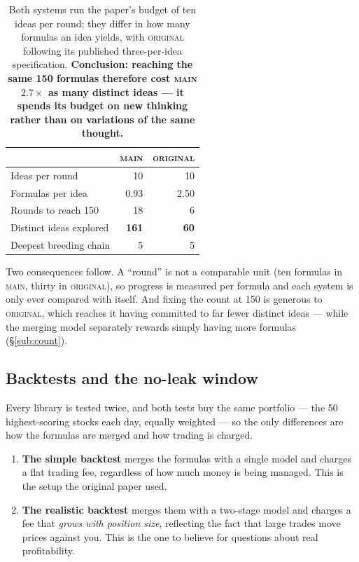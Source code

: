 \documentclass[11pt]{article}
\newcommand{\main}{\textsc{main}}
\newcommand{\orig}{\textsc{original}}
\begin{document}
\begin{table}[h]
\centering\small
\begin{tabular}{lrr}
\toprule
& \main{} & \orig{} \\
\midrule
Ideas per round             & 10    & 10 \\
Formulas per idea           & 0.93  & 2.50 \\
Rounds to reach 150         & 18    & 6 \\
Distinct ideas explored     & \textbf{161} & \textbf{60} \\
Deepest breeding chain      & 5     & 5 \\
\bottomrule
\end{tabular}
\caption{Both systems run the paper's budget of ten ideas per round; they differ in how
many formulas an idea yields, with \orig{} following its published three-per-idea
specification. \textbf{Conclusion: reaching the same 150 formulas therefore cost
\main{} $2.7\times$ as many distinct ideas --- it spends its budget on new thinking
rather than on variations of the same thought.}}
\label{tab:budget}
\end{table}

\noindent Two consequences follow. A ``round'' is not a comparable unit (ten formulas
in \main{}, thirty in \orig{}), so progress is measured per formula and each system is
only ever compared with itself. And fixing the count at 150 is generous to \orig{},
which reaches it having committed to far fewer distinct ideas --- while the merging
model separately rewards simply having more formulas (\S\ref{sub:count}).

\subsection{Backtests and the no-leak window}
\label{sub:noleak}

Every library is tested twice, and both tests buy the same portfolio --- the 50
highest-scoring stocks each day, equally weighted --- so the only differences are how
the formulas are merged and how trading is charged.

\begin{enumerate}[leftmargin=1.6em,itemsep=0.15em]
  \item \textbf{The simple backtest} merges the formulas with a single model and
        charges a flat trading fee, regardless of how much money is being managed.
        This is the setup the original paper used.
  \item \textbf{The realistic backtest} merges them with a two-stage model and charges
        a fee that \emph{grows with position size}, reflecting the fact that large
        trades move prices against you. This is the one to believe for questions about
        real profitability.
\end{enumerate}
\end{document}
